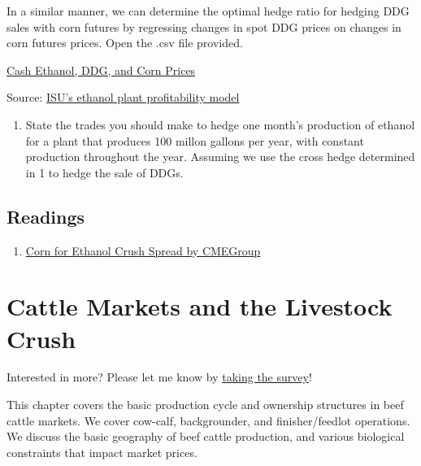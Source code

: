 \documentclass[
  letterpaper,
  DIV=11,
  numbers=noendperiod]{scrreprt}
\providecommand{\tightlist}{%
  \setlength{\itemsep}{0pt}\setlength{\parskip}{0pt}}\usepackage{longtable,booktabs,array}
\begin{document}
In a similar manner, we can determine the optimal hedge ratio for
hedging DDG sales with corn futures by regressing changes in spot DDG
prices on changes in corn futures prices. Open the .csv file provided.

\href{http://mindymallory.github.io/PriceAnalysis/Excel-files/Ethanol-Prices.csv}{Cash
Ethanol, DDG, and Corn Prices}

Source:
\href{https://www.extension.iastate.edu/agdm/articles/hof/HofJan08.html}{ISU's
ethanol plant profitability model}

\begin{enumerate}
\def\labelenumi{\arabic{enumi}.}
\setcounter{enumi}{1}
\tightlist
\item
  State the trades you should make to hedge one month's production of
  ethanol for a plant that produces 100 millon gallons per year, with
  constant production throughout the year. Assuming we use the cross
  hedge determined in 1 to hedge the sale of DDGs.
\end{enumerate}

\hypertarget{readings-5}{%
\section{Readings}\label{readings-5}}

\begin{enumerate}
\def\labelenumi{\arabic{enumi}.}
\tightlist
\item
  \href{http://www.cmegroup.com/trading/agricultural/files/AC-406_DDG_CornCrush_042010.pdf}{Corn
  for Ethanol Crush Spread by CMEGroup}
\end{enumerate}


\hypertarget{cattle-markets-and-the-livestock-crush}{%
\chapter{Cattle Markets and the Livestock
Crush}\label{cattle-markets-and-the-livestock-crush}}

{Interested in more? Please let me know by}
\href{https://forms.gle/Q3VByCQZHjfQSy9D7}{taking the survey}!

This chapter covers the basic production cycle and ownership structures
in beef cattle markets. We cover cow-calf, backgrounder, and
finisher/feedlot operations. We discuss the basic geography of beef
cattle production, and various biological constraints that impact market
prices.
\end{document}

